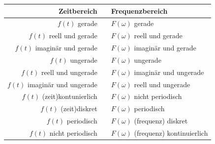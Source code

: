 					\renewcommand{\arraystretch}{1}					
					\begin{tabular}{|rcl|}
						\hline 
							\textbf{Zeitbereich} & \laplace  & \textbf{Frequenzbereich} \\ 
						\hline 
						\hline
							$f(t)$ gerade & \laplace & $F(\omega)$ gerade  \\ 
						\hline 
							$f(t)$ reell und gerade & \laplace & $F(\omega)$ reell und gerade\\ 
						\hline 
							$f(t)$ imaginär und gerade & \laplace & $F(\omega)$ imaginär und gerade \\ 
						\hline 
							$f(t)$ ungerade & \laplace & $F(\omega)$ ungerade \\ 
						\hline 
							$f(t)$ reell und ungerade & \laplace & $F(\omega)$ imaginär und ungerade \\ 
						\hline 
							$f(t)$ imaginär und ungerade & \laplace & $F(\omega)$ reell und ungerade\\ 
						\hline 
							$f(t)$ (zeit)kontunierlich & \laplace & $F(\omega)$ nicht periodisch \\ 
						\hline 
							$f(t)$ (zeit)diskret & \laplace & $F(\omega)$ periodisch \\ 
						\hline 
							$f(t)$ periodisch & \laplace & $F(\omega)$ (frequenz) diskret\\ 
						\hline 
							$f(t)$ nicht periodisch & \laplace & $F(\omega)$ (frequenz) kontinuierlich\\ 
						\hline 
					\end{tabular}
					\renewcommand{\arraystretch}{\arraystretchOriginal}	
					
